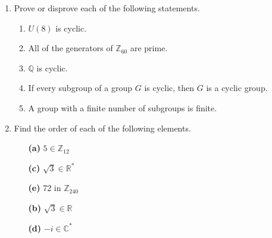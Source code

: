  
{\small
\begin{enumerate}
 
 
\bf\item\rm
Prove or disprove each of the following statements.
\begin{enumerate}
 
 \bf\item\rm
$U(8)$ is cyclic.
 
 \bf\item\rm
All of the generators of ${\mathbb Z}_{60}$ are prime.
 
 \bf\item\rm
${\mathbb Q}$ is cyclic.
 
 \bf\item\rm
If every subgroup of a group $G$ is cyclic, then $G$ is a cyclic
group. 
 
 \bf\item\rm
A group with a finite number of subgroups is finite.
 
\end{enumerate}
 
 
\bf\item\rm
Find the order of each of the following elements.
 
 
\vspace{3pt}        %
 
\hspace{-7pt}
\begin{minipage}[t]{4.6in}
\noindent
\begin{minipage}[t]{2.25in}
\begin{itemize}
 
 \item[{\bf (a)}]
$5 \in {\mathbb Z}_{12}$
 
 \item[{\bf (c)}]
$\sqrt{3} \in {\mathbb R}^\ast$
 
 \item[{\bf (e)}]
72 in ${\mathbb Z}_{240}$
 
\end{itemize}
\end{minipage} \hfill
\begin{minipage}[t]{2.25in}
\begin{itemize}
 
 \item[{\bf (b)}]
$\sqrt{3} \in {\mathbb R}$
 
 \item[{\bf (d)}]
$-i \in {\mathbb C}^\ast$
 

\end{itemize}
\end{minipage}
\end{minipage}
\end{enumerate}}
